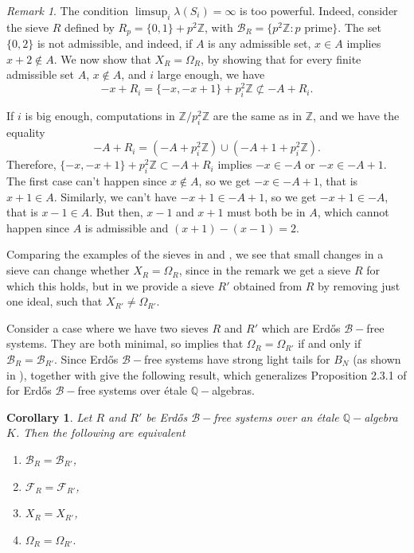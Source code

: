 \documentclass[a4paper,11pt,reqno]{amsart}
\theoremstyle{plain}
\newtheorem{corollary}[theorem]{Corollary}
\theoremstyle{remark}
\newtheorem{remark}[theorem]{Remark}
\newcommand{\q}{\mathbb{Q}}
\newcommand{\z}{\mathbb{Z}}
\newcommand{\cb}{\mathcal{B}}
\newcommand{\fr}{\mathcal{F}_R}
\newcommand{\frp}{\mathcal{F}_{R'}}
\begin{document}
			\begin{remark}
				\label{rmk: sieve with not infinite lambda but X and Omega equal}
				The condition  $\limsup_{i} \lambda(S_i) = \infty$ is too powerful. Indeed, consider the sieve $R$ defined by $R_p = \{0,1\}+p^2\z$, with $\cb_R= \{p^2\z: p \text{ prime}\}$. The set $\{0,2\}$ is not admissible, and indeed, if $A$ is any admissible set,  $x \in A$ implies $x+2\not \in A$. We now show that $X_R = \Omega_{R} $, by showing that for every finite admissible set $A$, $x\not \in A$, and $i$ large enough, we have $$-x+R_i = \{-x,-x+1\}+p_i^2\z \not \subset -A+R_i.$$ 
				
				If $i$ is big enough, computations in $\z/p_i^2\z$ are the same as in $\z$, and we have the equality $$-A+R_i = (-A +p_i^2\z)\cup (-A + 1+ p_i^2\z). $$ Therefore, $\{-x,-x+1\}+p_i^2\z  \subset -A+R_i$ implies $-x \in  -A$ or $-x \in -A+1$. The first case can't happen since $x \not \in A$, so we get $-x \in -A+1$, that is $x+1 \in A$. Similarly, we can't have $-x+1 \in -A+1$, so we get $-x+1 \in -A $, that is $x-1 \in A$. But then, $x-1$ and $x+1$ must both be in $A$, which cannot happen since $A$ is admissible and $(x+1)-(x-1) = 2$.
			\end{remark}
			
			
			Comparing the examples of the sieves in  and , we see that small changes in a sieve can change whether $X_R = \Omega_{R}$, since in the remark we get a sieve $R$ for which this holds, but in  we provide a sieve $R'$  obtained from $R$ by removing just one ideal, such that $X_{R'} \neq \Omega_{R'}$.  
			
			Consider a case where we have two sieves $R$ and $R'$ which are Erdős $\cb-$free systems. They are both minimal, so   implies that $\Omega_R = \Omega_{R'}$ if and only if $\cb_R = \cb_{R'}$. Since Erdős $\cb-$free systems have strong light tails for $B_N$ (as shown in  ),   together with  give the following result, which generalizes Proposition 2.3.1 of \cite{Kulaga} for Erdős $\cb-$free systems over étale $\q-$algebras.
			
			\begin{corollary}
				\label{crl: equivalence XR OmegaR for b free systems}
				Let $R$ and $R'$ be Erdős $\cb-$free systems over an étale $\q-$algebra $K$. Then the following are equivalent
				
				\begin{enumerate}
					\item $\cb_R = \cb_{R'}$,
					\item $\fr = \frp$,
					\item $X_R = X_{R'}$,
					\item $\Omega_{R} = \Omega_{R'}.$
				\end{enumerate} 
			\end{corollary}
			
\end{document}

